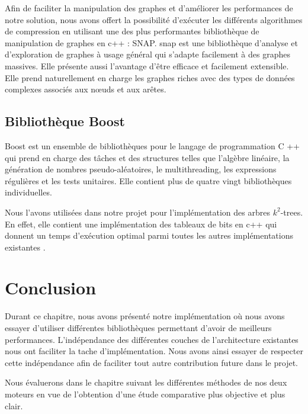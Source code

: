 		Afin de faciliter la manipulation des graphes et d'améliorer les performances de notre solution, nous avons offert la possibilité d'exécuter les différents algorithmes de compression en utilisant une des plus performantes bibliothèque de manipulation de graphes en c++ : SNAP.
		\gls{snap} est une bibliothèque d'analyse et d'exploration de graphes à usage général qui s'adapte facilement à des graphes massives. Elle présente aussi l'avantage d'être  efficace et facilement extensible. Elle prend naturellement en charge les graphes riches avec des types de données complexes associés aux nœuds et aux arêtes. 
		
		\subsection{Bibliothèque Boost}
		

Boost est un ensemble de bibliothèques pour le langage de programmation C ++ qui prend en charge des tâches et des structures telles que l'algèbre linéaire, la génération de nombres pseudo-aléatoires, le multithreading, les expressions régulières et les tests unitaires. Elle contient plus de quatre vingt bibliothèques individuelles.

Nous l'avons utilisées dans notre projet pour l'implémentation des arbres $k^2$-trees. En effet, elle contient une implémentation des tableaux de bits en c++ qui donnent un temps d'exécution optimal parmi toutes les autres implémentations existantes \citep{pieterse2010performance}.  


	\section{Conclusion}
	
Durant ce chapitre, nous avons présenté notre implémentation où nous avons essayer d'utiliser différentes bibliothèques permettant d'avoir de meilleurs performances. L'indépendance des différentes couches de l'architecture existantes nous ont faciliter la tache d'implémentation. Nous avons ainsi essayer de respecter cette indépendance afin de faciliter tout autre contribution future dans le projet. 

Nous évaluerons dans le chapitre suivant les différentes méthodes de nos deux moteurs en vue de l'obtention d'une étude comparative plus objective et plus clair.